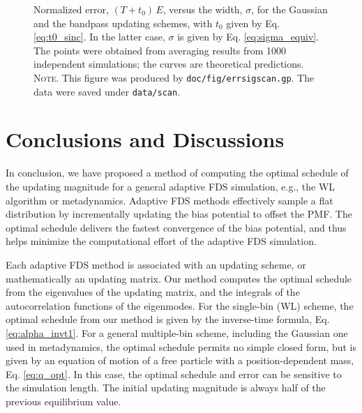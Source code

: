 \documentclass[reprint, floatfix]{revtex4-1}
\newcommand{\note}[1]{{\color{DarkGreen}\footnotesize \textsc{Note.} #1}}
\begin{document}
\begin{figure}[h]
\begin{center}
  \caption{
    \label{fig:errsigscan}
    Normalized error, $(T + t_0) \, E$,
    versus the width, $\sigma$,
    for the Gaussian
    and the bandpass updating schemes,
    with $t_0$ given by Eq. \eqref{eq:t0_sinc}.
    In the latter case,
    $\sigma$ is given by Eq. \eqref{eq:sigma_equiv}.
    The points were obtained from averaging results
    from 1000 independent simulations;
    the curves are theoretical predictions.
    \note{This figure was produced by
      \texttt{doc/fig/errsigscan.gp}.
      The data were saved under
      \texttt{data/scan}.
    }%
  }
\end{center}
\end{figure}





\section{\label{sec:conclusion}
Conclusions and Discussions}



In conclusion,
we have proposed a method of computing
the optimal schedule of the updating magnitude
for a general adaptive FDS simulation,
e.g., the WL algorithm or metadynamics.
%
Adaptive FDS methods
effectively sample a flat distribution
by incrementally updating the bias potential
to offset the PMF.
%
The optimal schedule delivers the fastest convergence
of the bias potential,
and thus helps minimize the computational effort
of the adaptive FDS simulation.



Each adaptive FDS method is associated with
an updating scheme,
or mathematically an updating matrix.
%
Our method computes the optimal schedule from
the eigenvalues of the updating matrix,
and the integrals of the autocorrelation functions
of the eigenmodes.
%
For the single-bin (WL) scheme,
the optimal schedule from our method
is given by the inverse-time formula,
Eq. \eqref{eq:alpha_invt1}.
%
For a general multiple-bin scheme,
including the Gaussian one used in metadynamics,
the optimal schedule permits no simple closed form,
but is given by an equation of motion
of a free particle with a position-dependent mass, Eq. \eqref{eq:q_opt}.
%
In this case,
the optimal schedule and error
can be sensitive to the simulation length.
%
The initial updating magnitude is always
half of the previous equilibrium value.
\end{document}
